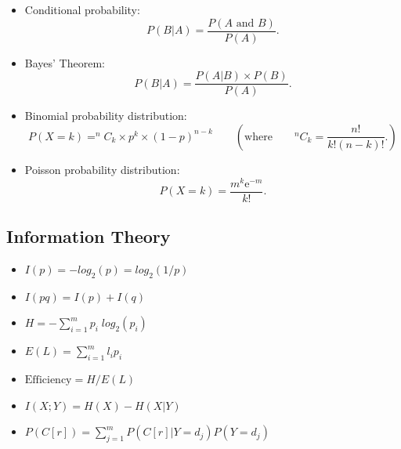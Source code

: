 \documentclass[a4paper,12pt]{article}
\begin{document}
\begin{itemize}
\begin{itemize}
\item Conditional probability:
\begin{equation*}
P(B|A)=\frac{P\left( A\text{ and }B\right) }{P\left( A\right) }.
\end{equation*}


\item Bayes' Theorem:
\begin{equation*}
P(B|A)=\frac{P\left(A|B\right) \times P(B) }{P\left( A\right) }.
\end{equation*}


\item Binomial probability distribution:
\begin{equation*}
P(X = k) = ^{n}C_{k} \times p^{k} \times \left( 1-p\right) ^{n-k}\qquad \left( \text{where}\qquad
^{n}C_{k} =\frac{n!}{k!\left(n-k\right) !}. \right)
\end{equation*}

\item Poisson probability distribution:
\begin{equation*}
P(X = k) =\frac{m^{k}\mathrm{e}^{-m}}{k!}.
\end{equation*}
\end{itemize}

\subsection*{Information Theory}

\begin{itemize}
\item $I(p) = - log_{2}(p) = log_{2}(1/p)$\\

\item $I(pq) = I(p) + I(q)$\\

\item $H = - \sum_{i=1}^{m}p_{i}\; log_{2}(p_{i})$\\

\item $E(L) = \sum_{i=1}^{m} l_{i} p_{i}$\\

\item $\mbox{Efficiency} = H / E(L)$\\

\item $I(X;Y) = H(X) - H(X|Y)$\\

\item $P(C[r]) = \sum_{j=1}^{m}P(C[r]|Y=d_{j} )P(Y=d_{j} )$


\end{itemize}
\end{itemize}
\end{document}
